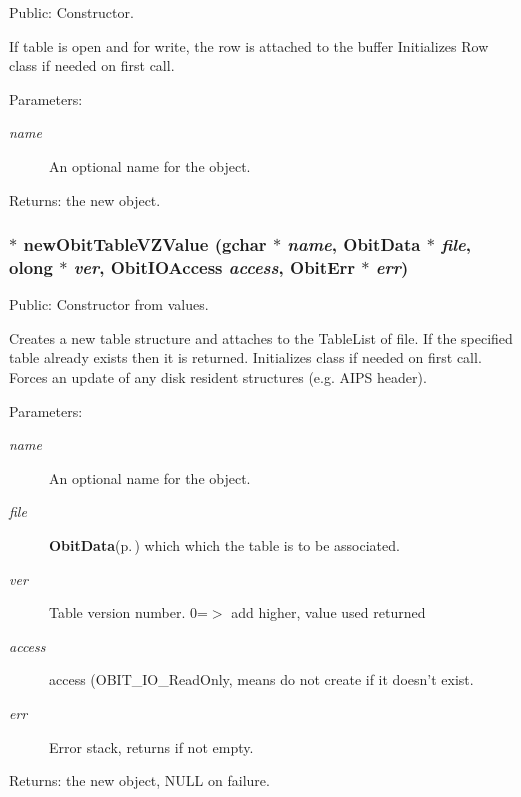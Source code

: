 Public: Constructor. 

If table is open and for write, the row is attached to the buffer Initializes Row class if needed on first call. \begin{Desc}
\item[Parameters:]
\begin{description}
\item[{\em name}]An optional name for the object. \end{description}
\end{Desc}
\begin{Desc}
\item[Returns:]the new object. \end{Desc}
\subsubsection{$\ast$ new\-Obit\-Table\-VZValue (gchar $\ast$ {\em name}, {\bf Obit\-Data} $\ast$ {\em file}, {\bf olong} $\ast$ {\em ver}, Obit\-IOAccess {\em access}, {\bf Obit\-Err} $\ast$ {\em err})}\label{ObitTableVZ_8h_a12}


Public: Constructor from values. 

Creates a new table structure and attaches to the Table\-List of file. If the specified table already exists then it is returned. Initializes class if needed on first call. Forces an update of any disk resident structures (e.g. AIPS header). \begin{Desc}
\item[Parameters:]
\begin{description}
\item[{\em name}]An optional name for the object. \item[{\em file}]{\bf Obit\-Data}{\rm (p.\,\pageref{structObitData})} which which the table is to be associated. \item[{\em ver}]Table version number. 0=$>$ add higher, value used returned \item[{\em access}]access (OBIT\_\-IO\_\-Read\-Only, means do not create if it doesn't exist. \item[{\em err}]Error stack, returns if not empty. \end{description}
\end{Desc}
\begin{Desc}
\item[Returns:]the new object, NULL on failure. \end{Desc}
